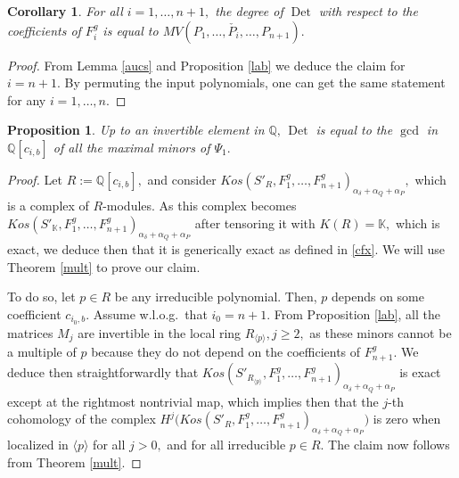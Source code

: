 \documentclass[a4paper,11pt]{amsart}
\newcommand{\Det}{\operatorname{Det}}
\newcommand{\K}{\mathbb{K}}
\newcommand{\Q}{\mathbb{Q}}
\newcounter{thm}
\numberwithin{thm}{section}
\numberwithin{equation}{section}
\theoremstyle{definition}
\theoremstyle{plain}
\newtheorem{proposition}[thm]{Proposition}
\newtheorem{corollary}[thm]{Corollary}
\begin{document}
\begin{corollary}\label{grad}
For all $i=1,\ldots, n+1,$ the degree of $\Det$ with respect to the coefficients of $F^g_i$ is equal to $MV(P_1,\ldots, \check{P_i},\ldots, P_{n+1}).$
\end{corollary}
\begin{proof}
From Lemma \ref{aucs} and Proposition \ref{lab} we deduce the claim for $i=n+1.$ By permuting the input polynomials, one can get the same statement for any $i=1,\ldots, n.$ \end{proof}


\begin{proposition}\label{gcd}
Up to an invertible element in $\Q,\, \Det$ is equal to the $\gcd$ in $\Q[c_{i,b}]$ of all the maximal minors of $\Psi_{1}.$
\end{proposition}

\begin{proof}
Let $R:=\Q[c_{i,b}],$ and consider $Kos(S'_R,F^g_1,\ldots, F^g_{n+1})_{\alpha_\delta+\alpha_Q+\alpha_P},$
which is a complex of $R$-modules. As this complex becomes  $Kos(S'_\K,F^g_1,\ldots, F^g_{n+1})_{\alpha_\delta+\alpha_Q+\alpha_P}$ after tensoring it with $K(R)=\K,$ which is exact, we deduce then that it is generically exact as defined in \eqref{cfx}. We will use Theorem \ref{mult} to prove our claim.

To do so, let $p\in R$ be any irreducible polynomial. Then, $p$ depends on some coefficient $c_{i_0,b}$. Assume w.l.o.g.~that $i_0=n+1.$ From Proposition \ref{lab}, all the matrices $M_j$ are invertible in the local ring $R_{\langle p\rangle},
j\geq 2,$ as these minors cannot be a multiple of $p$ because they do not depend on the coefficients of $F^g_{n+1}.$
We deduce then straightforwardly that $Kos(S'_{R_{\langle p\rangle}},F^g_1,\ldots, F^g_{n+1})_{\alpha_\delta+\alpha_Q+\alpha_P}$
is exact except at the rightmost nontrivial map, which implies then that  the $j$-th cohomology of the complex
$H^j\big(Kos(S'_R,F^g_1,\ldots, F^g_{n+1})_{\alpha_\delta+\alpha_Q+\alpha_P}\big)$ is zero when localized in $\langle p\rangle$ for all $j>0,$ and for all irreducible $p\in R.$ The claim now follows from Theorem \ref{mult}.
\end{proof}
\end{document}
